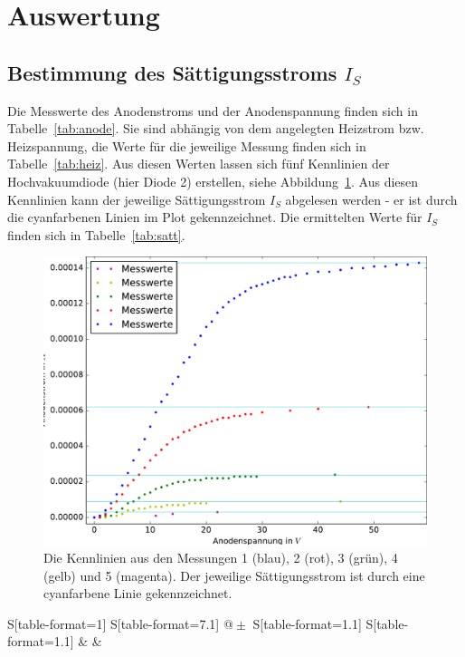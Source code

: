 \section{Auswertung}
\label{sec:Auswertung}


\subsection{Bestimmung des Sättigungsstroms $I_S$}
Die Messwerte des Anodenstroms und der Anodenspannung finden sich in Tabelle~\ref{tab:anode}. Sie sind abhängig von dem angelegten Heizstrom bzw. Heizspannung, die Werte für die jeweilige Messung finden sich in Tabelle~\ref{tab:heiz}.
Aus diesen Werten lassen sich fünf Kennlinien der Hochvakuumdiode (hier Diode 2) erstellen, siehe Abbildung~\ref{fig:kennlinie}. Aus diesen Kennlinien kann der jeweilige Sättigungsstrom $I_S$ abgelesen werden - er ist durch die cyanfarbenen Linien im Plot gekennzeichnet. Die ermittelten Werte für $I_S$ finden sich in Tabelle~\ref{tab:satt}.

\begin{figure}[H]
  \centering
  \includegraphics[width=0.6\textheight]{../plots/anode1.pdf}
  \caption{Die Kennlinien aus den Messungen 1 (blau), 2 (rot), 3 (grün), 4 (gelb) und 5 (magenta). Der jeweilige Sättigungsstrom ist durch eine cyanfarbene Linie gekennzeichnet. }
\label{fig:kennlinie}
\end{figure}

\begin{table}
  \centering
  \caption{Heizstrom und -spannung für die Messungen 1 bis 5.}
\label{tab:heiz}
  \begin{tabular}{
      S[table-format=1]
      S[table-format=7.1]
      @{${}\pm{}$}
      S[table-format=1.1]
      S[table-format=1.1]
      }
      \toprule
       &  &  \\
      \midrule
      \bottomrule
  \end{tabular}
\end{table}


